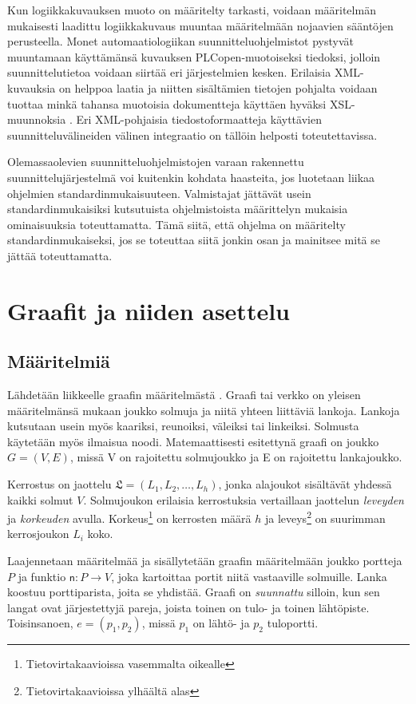 \documentclass[finnish,12pt]{article}
\begin{document}
Kun logiikkakuvauksen muoto on määritelty tarkasti, voidaan määritelmän mukaisesti laadittu logiikkakuvaus muuntaa määritelmään nojaavien sääntöjen perusteella.
Monet automaatiologiikan suunnitteluohjelmistot pystyvät muuntamaan käyttämänsä kuvauksen PLCopen-muotoiseksi tiedoksi, jolloin suunnittelutietoa voidaan siirtää eri järjestelmien kesken.
Erilaisia XML-kuvauksia on helppoa laatia ja niitten sisältämien tietojen pohjalta voidaan tuottaa minkä tahansa muotoisia dokumentteja käyttäen hyväksi XSL-muunnoksia \cite{RefWorks:61}. Eri XML-pohjaisia tiedostoformaatteja käyttävien suunnitteluvälineiden välinen integraatio on tällöin helposti toteutettavissa.

Olemassaolevien suunnitteluohjelmistojen varaan rakennettu suunnittelujärjestelmä voi kuitenkin kohdata haasteita, jos luotetaan liikaa ohjelmien standardinmukaisuuteen.
Valmistajat jättävät usein standardinmukaisiksi kutsutuista ohjelmistoista määrittelyn mukaisia ominaisuuksia toteuttamatta.
Tämä siitä, että ohjelma on määritelty standardinmukaiseksi, jos se toteuttaa siitä jonkin osan ja mainitsee mitä se jättää toteuttamatta. \cite{RefWorks:42}

	\clearpage
		
	\section{Graafit ja niiden asettelu}

	\subsection{Määritelmiä}

Lähdetään liikkeelle graafin määritelmästä \cite{RefWorks:39}.
Graafi tai verkko on yleisen määritelmänsä mukaan joukko solmuja ja niitä yhteen liittäviä lankoja.
Lankoja kutsutaan usein myös kaariksi, reunoiksi, väleiksi tai linkeiksi. Solmusta käytetään myös ilmaisua noodi.
Matemaattisesti esitettynä graafi on joukko $G = (V, E)$, missä V on rajoitettu solmujoukko ja E on rajoitettu lankajoukko.

Kerrostus on jaottelu $\mathfrak{L} = (L_1, L_2, \dots, L_h)$, jonka alajoukot sisältävät yhdessä kaikki solmut $V$.
Solmujoukon erilaisia kerrostuksia vertaillaan jaottelun \emph{leveyden} ja \emph{korkeuden} avulla.
Korkeus\footnote{Tietovirtakaavioissa vasemmalta oikealle} on kerrosten määrä $h$ ja leveys\footnote{Tietovirtakaavioissa ylhäältä alas} on suurimman kerrosjoukon $L_i$ koko.

Laajennetaan määritelmää ja sisällytetään graafin määritelmään joukko portteja $P$ ja funktio $\mathsf{n} : P \rightarrow V$, joka kartoittaa portit niitä vastaaville solmuille.
Lanka koostuu porttiparista, joita se yhdistää. Graafi on \emph{suunnattu} silloin, kun sen langat ovat järjestettyjä pareja, joista toinen on tulo- ja toinen lähtöpiste. Toisinsanoen, $e = (p_1, p_2)$, missä $p_1$ on lähtö- ja $p_2$ tuloportti.
\end{document}
